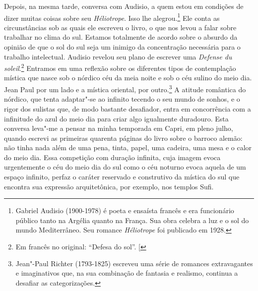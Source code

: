 Depois, na mesma tarde, conversa com Audisio, a quem estou em
condições de dizer muitas coisas sobre seu \emph{Héliotrope}. Isso lhe
alegrou.\footnote{Gabriel Audisio (1900-1978) é poeta e ensaísta
  francês e era funcionário público tanto na Argélia quanto na França.
  Sua obra celebra a luz e o sol do mundo Mediterrâneo. Seu romance
  \emph{Héliotrope} foi publicado em 1928. \versal{[N. E.]}} Ele conta as circunstâncias
sob as quais ele escreveu o livro, o que nos levou a falar sobre
trabalhar no clima do sul. Estamos totalmente de acordo sobre o absurdo
da opinião de que o sol do sul seja um inimigo da concentração
necessária para o trabalho intelectual. Audisio revelou seu plano
de escrever uma \emph{Defense du soleil}.\footnote{Em francês no original: ``Defesa do sol''. {[}\versal{N. T.}{]}} Entramos em uma reflexão sobre os
diferentes tipos de contemplação mística que nasce sob o nórdico céu da
meia noite e sob o céu sulino do meio dia. Jean Paul por um lado e a
mística oriental, por outro.\footnote{Jean"-Paul Richter (1793-1825)
  escreveu uma série de romances extravagantes e imaginativos que, na sua
  combinação de fantasia e realismo, continua a desafiar as
  categorizações. \versal{[N. E.]}} A atitude romântica do nórdico, que tenta adaptar"-se
ao infinito tecendo o seu mundo de sonhos, e o rigor dos sulistas que,
de modo bastante desafiador, entra em concorrência com a infinitude do
azul do meio dia para criar algo igualmente duradouro. Esta conversa
leva"-me a pensar na minha temporada em Capri, em pleno julho, quando
escrevi as primeiras quarenta páginas do livro sobre o barroco alemão:
não tinha nada além de uma pena, tinta, papel, uma cadeira, uma mesa e o
calor do meio dia. Essa competição com duração infinita, cuja imagem
evoca urgentemente o céu do meio dia do sul como o céu noturno evoca
aquela de um espaço infinito, perfaz o caráter reservado e construtivo
da mística do sul que encontra sua expressão arquitetônica, por exemplo,
nos templos Sufi.

